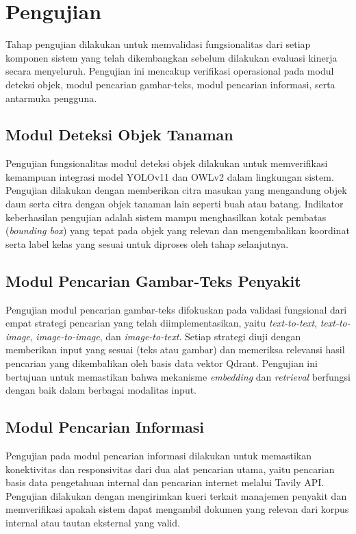 \section{Pengujian}
Tahap pengujian dilakukan untuk memvalidasi fungsionalitas dari setiap komponen sistem yang telah dikembangkan sebelum dilakukan evaluasi kinerja secara menyeluruh. Pengujian ini mencakup verifikasi operasional pada modul deteksi objek, modul pencarian gambar-teks, modul pencarian informasi, serta antarmuka pengguna.

\subsection{Modul Deteksi Objek Tanaman}
Pengujian fungsionalitas modul deteksi objek dilakukan untuk memverifikasi kemampuan integrasi model YOLOv11 dan OWLv2 dalam lingkungan sistem. Pengujian dilakukan dengan memberikan citra masukan yang mengandung objek daun serta citra dengan objek tanaman lain seperti buah atau batang. Indikator keberhasilan pengujian adalah sistem mampu menghasilkan kotak pembatas (\textit{bounding box}) yang tepat pada objek yang relevan dan mengembalikan koordinat serta label kelas yang sesuai untuk diproses oleh tahap selanjutnya.

\subsection{Modul Pencarian Gambar-Teks Penyakit}
Pengujian modul pencarian gambar-teks difokuskan pada validasi fungsional dari empat strategi pencarian yang telah diimplementasikan, yaitu \textit{text-to-text}, \textit{text-to-image}, \textit{image-to-image}, dan \textit{image-to-text}. Setiap strategi diuji dengan memberikan input yang sesuai (teks atau gambar) dan memeriksa relevansi hasil pencarian yang dikembalikan oleh basis data vektor Qdrant. Pengujian ini bertujuan untuk memastikan bahwa mekanisme \textit{embedding} dan \textit{retrieval} berfungsi dengan baik dalam berbagai modalitas input.

\subsection{Modul Pencarian Informasi}
Pengujian pada modul pencarian informasi dilakukan untuk memastikan konektivitas dan responsivitas dari dua alat pencarian utama, yaitu pencarian basis data pengetahuan internal dan pencarian internet melalui Tavily API. Pengujian dilakukan dengan mengirimkan kueri terkait manajemen penyakit dan memverifikasi apakah sistem dapat mengambil dokumen yang relevan dari korpus internal atau tautan eksternal yang valid.

